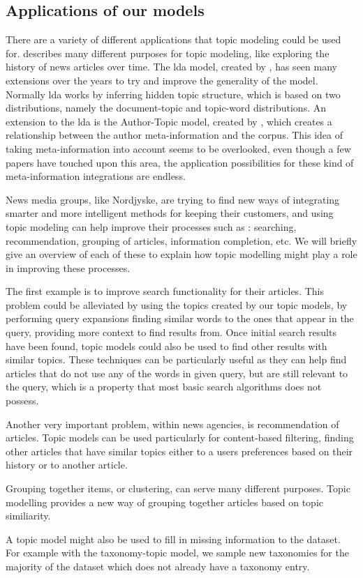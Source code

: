 \subsection{Applications of our models}\label{sec:appendix_applications}
There are a variety of different applications that topic modeling could be used for. 
\citet{Probabilistic_Topic_Models} describes many different purposes for topic modeling, like exploring the history of news articles over time.
The \gls{lda} model, created by \citet{blei2003latent}, has seen many extensions over the years to try and improve the generality of the model.
Normally \gls{lda} works by inferring hidden topic structure, which is based on two distributions, namely the document-topic and topic-word distributions.
An extension to the \gls{lda} is the Author-Topic model, created by \citet{author_topic_2012}, which creates a relationship between the author meta-information and the corpus.
This idea of taking meta-information into account seems to be overlooked, even though a few papers have touched upon this area, the application possibilities for these kind of meta-information integrations are endless.

News media groups, like Nordjyske, are trying to find new ways of integrating smarter and more intelligent methods for keeping their customers, and using topic modeling can help improve their processes such as : searching, recommendation, grouping of articles, information completion, etc.
We will briefly give an overview of each of these to explain how topic modelling might play a role in improving these processes.

The first example is to improve search functionality for their articles.
This problem could be alleviated by using the topics created by our topic models, by performing query expansions finding similar words to the ones that appear in the query, providing more context to find results from.
Once initial search results have been found, topic models could also be used to find other results with similar topics.
These techniques can be particularly useful as they can help find articles that do not use any of the words in given query, but are still relevant to the query, which is a property that most basic search algorithms does not possess.

Another very important problem, within news agencies, is recommendation of articles.
Topic models can be used particularly for content-based filtering, finding other articles that have similar topics either to a users preferences based on their history or to another article.

Grouping together items, or clustering, can serve many different purposes. Topic modelling provides a new way of grouping together articles based on topic similiarity.

A topic model might also be used to fill in missing information to the dataset.
For example with the taxonomy-topic model, we sample new taxonomies for the majority of the dataset which does not already have a taxonomy entry.
